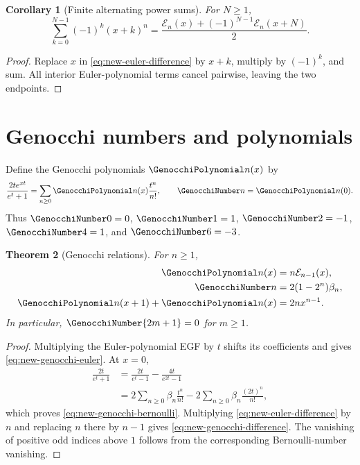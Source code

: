 \documentclass[11pt,a4paper,oneside,openany]{book}
\newtheorem{theorem}{Theorem}[chapter]
\newtheorem{corollary}[theorem]{Corollary}
\theoremstyle{definition}
\theoremstyle{remark}
\begin{document}
\begin{corollary}[Finite alternating power sums]\label{cor:new-alternating-powers}
For $N\ge1$,
\begin{equation}\label{eq:new-alternating-powers}
 \boxed{\displaystyle
 \sum_{k=0}^{N-1}(-1)^k(x+k)^n
 =\frac{\mathcal E_n(x)+(-1)^{N-1}\mathcal E_n(x+N)}{2}.}
\end{equation}
\end{corollary}

\begin{proof}
Replace $x$ in \eqref{eq:new-euler-difference} by $x+k$, multiply by
$(-1)^k$, and sum.  All interior Euler-polynomial terms cancel pairwise,
leaving the two endpoints.
\end{proof}

\section{Genocchi numbers and polynomials}

Define the Genocchi polynomials $\GenocchiPolynomial n(x)$ by
\begin{equation}\label{eq:new-genocchi-egf}
 \frac{2t e^{xt}}{e^t+1}
 =\sum_{n\ge0}\GenocchiPolynomial n(x)\frac{t^n}{n!},
 \qquad \GenocchiNumber n=\GenocchiPolynomial n(0).
\end{equation}
Thus $\GenocchiNumber0=0$, $\GenocchiNumber1=1$, $\GenocchiNumber2=-1$,
$\GenocchiNumber4=1$, and $\GenocchiNumber6=-3$.

\begin{theorem}[Genocchi relations]\label{thm:new-genocchi}
For $n\ge1$,
\begin{align}
 \GenocchiPolynomial n(x)&=n\mathcal E_{n-1}(x),
 \label{eq:new-genocchi-euler}\\
 \GenocchiNumber n&=2(1-2^n)\beta_n,
 \label{eq:new-genocchi-bernoulli}\\
 \GenocchiPolynomial n(x+1)+\GenocchiPolynomial n(x)&=2n x^{n-1}.
 \label{eq:new-genocchi-difference}
\end{align}
In particular, $\GenocchiNumber{2m+1}=0$ for $m\ge1$.
\end{theorem}

\begin{proof}
Multiplying the Euler-polynomial EGF by $t$ shifts its coefficients and gives
\eqref{eq:new-genocchi-euler}.  At $x=0$,
\begin{align*}
 \frac{2t}{e^t+1}
 &=\frac{2t}{e^t-1}-\frac{4t}{e^{2t}-1}\\
 &=2\sum_{n\ge0}\beta_n\frac{t^n}{n!}
   -2\sum_{n\ge0}\beta_n\frac{(2t)^n}{n!},
\end{align*}
which proves \eqref{eq:new-genocchi-bernoulli}.  Multiplying
\eqref{eq:new-euler-difference} by $n$ and replacing $n$ there by $n-1$
gives \eqref{eq:new-genocchi-difference}.  The vanishing of positive odd
indices above $1$ follows from the corresponding Bernoulli-number vanishing.
\end{proof}
\end{document}
